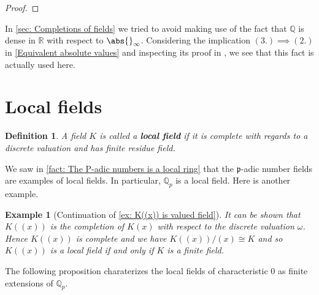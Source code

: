 \documentclass{article}
\newtheorem{definition}{Definition}[section]
\newtheorem{example}{Example}[section]
\newcommand{\mfrak}[1]{\mathfrak{#1}}
\newcommand{\mbb}[1]{\mathbb{#1}}
\numberwithin{equation}{section}
\begin{document}
\begin{proof}

\end{proof}
In \cref{sec: Completions of fields} we tried to avoid making use of the fact that $\mbb Q$ is dense in $\mbb R$ with respect to $\abs{}_\infty$. Considering the implication $(3.) \implies (2.)$ in \cref{Equivalent absolute values} and inspecting its proof in \citep[Proposition 3.3]{neukirch}, we see that this fact is actually used here.

\section{Local fields}

\begin{definition}\label{def: Local field}
    A field $K$ is called a \textbf{local field} if it is complete with regards to a discrete valuation and has finite residue field.
\end{definition}

We saw in \cref{fact: The P-adic numbers is a local ring} that the $\mfrak p$-adic number fields are examples of local fields. In particular, $\mbb Q_p$ is a local field. Here is another example.
\begin{example}[Continuation of \cref{ex: K((x)) is valued field}]\label{K((x)) is local if K finite}
    It can be shown that $K((x))$ is the completion of $K(x)$ with respect to the discrete valuation $\omega$. Hence $K((x))$ is complete and we have $K((x)) / (x) \cong K$ and so $K((x))$ is a local field if and only if $K$ is a finite field.
\end{example}

The following proposition charaterizes the local fields of characteristic 0 as finite extensions of $\mbb Q_p$.
\end{document}
